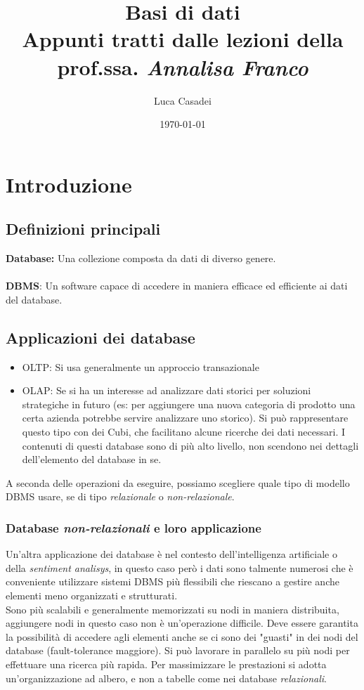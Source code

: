 \documentclass[a4paper,12pt]{report}
\title{Basi di dati\\Appunti tratti dalle lezioni della prof.ssa. \textit{Annalisa Franco}}
\author{Luca Casadei}
\date{\today}
\begin{document}
	\maketitle
	\tableofcontents

	\chapter{Introduzione}
	\section{Definizioni principali}
	\textbf{Database:} Una collezione composta da dati di diverso genere.\\\\
	\textbf{DBMS}: Un software capace di accedere in maniera efficace ed efficiente ai dati del database.\\
	\section{Applicazioni dei database}
	\begin{itemize}
		\item OLTP: Si usa generalmente un approccio transazionale
		\item OLAP: Se si ha un interesse ad analizzare dati storici per soluzioni strategiche in futuro (es: per aggiungere una nuova categoria di prodotto una certa azienda potrebbe servire analizzare uno storico). Si può rappresentare questo tipo con dei Cubi, che facilitano alcune ricerche dei dati necessari. I contenuti di questi database sono di più alto livello, non scendono nei dettagli dell'elemento del database in se.
	\end{itemize}
A seconda delle operazioni da eseguire, possiamo scegliere quale tipo di modello DBMS usare, se di tipo \textit{relazionale} o \textit{non-relazionale}.
\subsection*{Database \textit{non-relazionali} e loro applicazione}
Un'altra applicazione dei database è nel contesto dell'intelligenza artificiale o della \textit{sentiment analisys}, in questo caso però i dati sono talmente numerosi che è conveniente utilizzare sistemi DBMS più flessibili che riescano a gestire anche elementi meno organizzati e strutturati.\\
Sono più scalabili e generalmente memorizzati su nodi in maniera distribuita, aggiungere nodi in questo caso non è un'operazione difficile.
Deve essere garantita la possibilità di accedere agli elementi anche se ci sono dei "guasti" in dei nodi del database (fault-tolerance maggiore). Si può lavorare in parallelo su più nodi per effettuare una ricerca più rapida. Per massimizzare le prestazioni si adotta un'organizzazione ad albero, e non a tabelle come nei database \textit{relazionali}.
\end{document}
